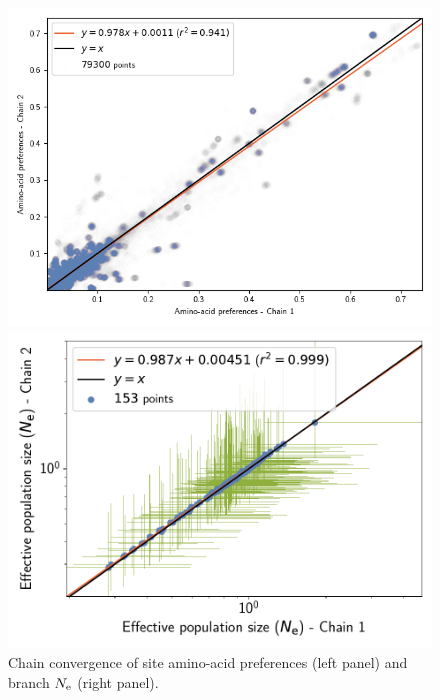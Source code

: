 \documentclass{article}
\begin{document}
	\begin{figure}[H]
		\centering
		\begin{minipage}{0.49\linewidth}
			\includegraphics[width=\linewidth, page=1]{mammals/18CDS_SiteMutSelBranchNe_R1_ProfileCorrelation.png}
		\end{minipage} \hfill
		\begin{minipage}{0.49\linewidth}
			\includegraphics[width=\linewidth, page=1]{mammals/18CDS_SiteMutSelBranchNe_R1_LogPopulationSizeCorrelation}
		\end{minipage}
		\caption[Chain convergence of site profiles and branche $\Ne$]{
		Chain convergence of site amino-acid preferences (left panel) and branch $\Ne$ (right panel).}
	\end{figure}
\end{document}
